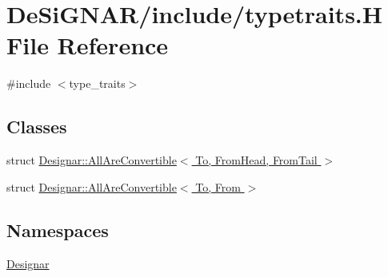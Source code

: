 \hypertarget{typetraits_8_h}{}\section{De\+Si\+G\+N\+A\+R/include/typetraits.H File Reference}
\label{typetraits_8_h}
{\ttfamily \#include $<$type\+\_\+traits$>$}\newline
\subsection*{Classes}
\begin{DoxyCompactItemize}
\item 
struct \hyperlink{struct_designar_1_1_all_are_convertible}{Designar\+::\+All\+Are\+Convertible$<$ To, From\+Head, From\+Tail $>$}
\item 
struct \hyperlink{struct_designar_1_1_all_are_convertible_3_01_to_00_01_from_01_4}{Designar\+::\+All\+Are\+Convertible$<$ To, From $>$}
\end{DoxyCompactItemize}
\subsection*{Namespaces}
\begin{DoxyCompactItemize}
\item 
 \hyperlink{namespace_designar}{Designar}
\end{DoxyCompactItemize}
